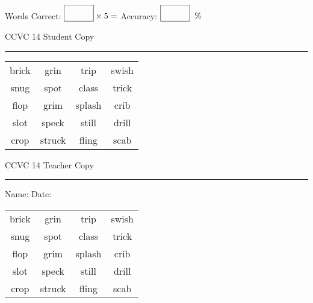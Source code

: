 \documentclass{memoir}
\begin{document}
\normalsize

Words Correct: $\fbox{\phantom{\huge 100}} \times 5 = $ Accuracy: $\fbox{\phantom{\huge 100}}\;\; \%$ 

\vfill

\newpage


\footnotesize \noindent
CCVC 14 \hfill Student Copy
\smallskip
\hrule

\Large

\setlength{\tabcolsep}{14pt}
\def\arraystretch{3}

{\selectfont


\begin{vplace}[0.5]
\begin{center}
\begin{tabular}{cccc}
brick       & grin     & trip & swish \\
snug & spot & class             & trick \\
flop & grim       & splash & crib \\
slot & speck & still & drill \\
crop & struck & fling & scab \\
\end{tabular}
\end{center}
\end{vplace}

}

\newpage

\footnotesize \noindent
CCVC 14 \hfill Teacher Copy
\smallskip
\hrule

\normalsize

\vfill

\noindent
Name: \underline{\hspace{1.75in}} \hfill Date: \underline{\hspace{1in}}

\Large

{\selectfont


\begin{vplace}[0.5]
\begin{center}
\begin{tabular}{cccc}
brick       & grin     & trip & swish \\
snug & spot & class             & trick \\
flop & grim       & splash & crib \\
slot & speck & still & drill \\
crop & struck & fling & scab \\
\end{tabular}
\end{center}
\end{vplace}



}
\end{document}
